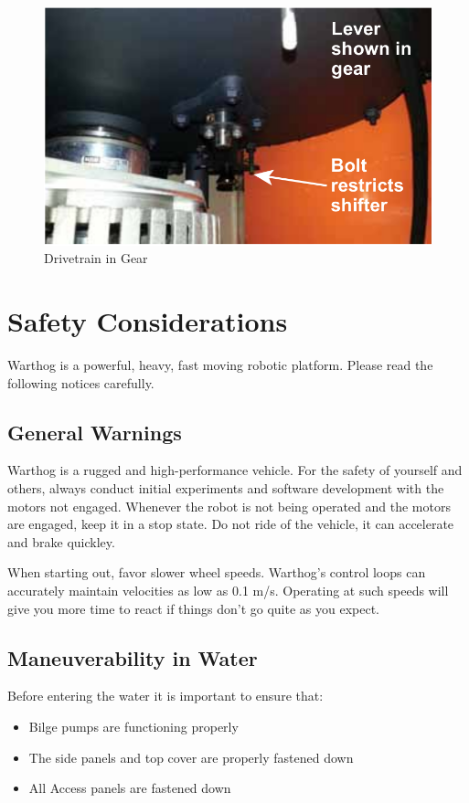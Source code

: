 \documentclass[]{clearpath-latex/clearpath-manual}
\begin{document}
\begin{figure}[!htb]
  \centering
  \includegraphics[width=0.75\linewidth]{drivetrain-gear.png}
  \caption{Drivetrain in Gear}
  \label{drivetrain-g}
\end{figure}


\section{Safety Considerations}

Warthog is a powerful, heavy, fast moving robotic platform. Please read the following notices carefully.

\subsection{General Warnings}

Warthog is a rugged and high-performance vehicle. For the safety of yourself and others, always conduct initial experiments and software development with the motors not engaged.  Whenever the robot is not being operated and the motors are engaged, keep it in a stop state.  Do not ride of the vehicle, it can accelerate and brake quickley.

When starting out, favor slower wheel speeds. Warthog's control loops can accurately maintain velocities as low as 0.1 m/s. Operating at such speeds will give you more time to react if things don’t go quite as you expect.

\subsection{Maneuverability in Water}

Before entering the water it is important to ensure that:

\begin{itemize}[nolistsep]
  \item Bilge pumps are functioning properly
  \item The side panels and top cover are properly fastened down
  \item All Access panels are fastened down
\end{itemize}
\end{document}
